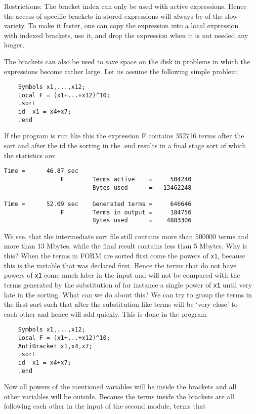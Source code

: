 \noindent
Restrictions: The bracket index can only be used with active expressions. 
Hence the access of specific brackets in stored expressions will always be 
of the slow variety. To make it faster, one can copy the expression into a 
local expression with indexed brackets, use it, and drop the expression 
when it is not needed any longer.

The brackets can also be used to save space on the disk in problems in 
which the expressions become rather large. Let us assume the following 
simple problem:
\begin{verbatim}
    Symbols x1,...,x12;
    Local F = (x1+...+x12)^10;
    .sort
    id  x1 = x4+x7;
    .end
\end{verbatim}
If the program is run like this the expression F contains 352716 terms 
after the sort and after the id the sorting in the .end results in a final 
stage sort of which the statistics are:
\begin{verbatim}
Time =      46.87 sec
                F        Terms active    =     504240
                         Bytes used      =   13462248

Time =      52.09 sec    Generated terms =     646646
                F        Terms in output =     184756
                         Bytes used      =    4883306
\end{verbatim}
We see, that the intermediate sort file still contains more than 500000 
terms and more than 13 Mbytes, while the final result contains less than 5 
Mbytes. Why is this? When the terms in FORM are sorted first come the 
powers of \verb:x1:, because this is the variable that was declared first. 
Hence the terms that do not have powers of \verb:x1: come much later in the 
input and will not be compared with the terms generated by the substitution 
of for instance a single power of \verb:x1: until very late in the sorting. 
What can we do about this? We can try to group the terms in the first sort 
such that after the substitution like terms will be `very close' to each 
other and hence will add quickly. This is done in the program
\begin{verbatim}
    Symbols x1,...,x12;
    Local F = (x1+...+x12)^10;
    AntiBracket x1,x4,x7;
    .sort
    id  x1 = x4+x7;
    .end
\end{verbatim}
Now all powers of the mentioned variables will be inside the brackets and 
all other variables will be outside. Because the terms inside the brackets 
are all following each other in the input of the second module, terms that 
